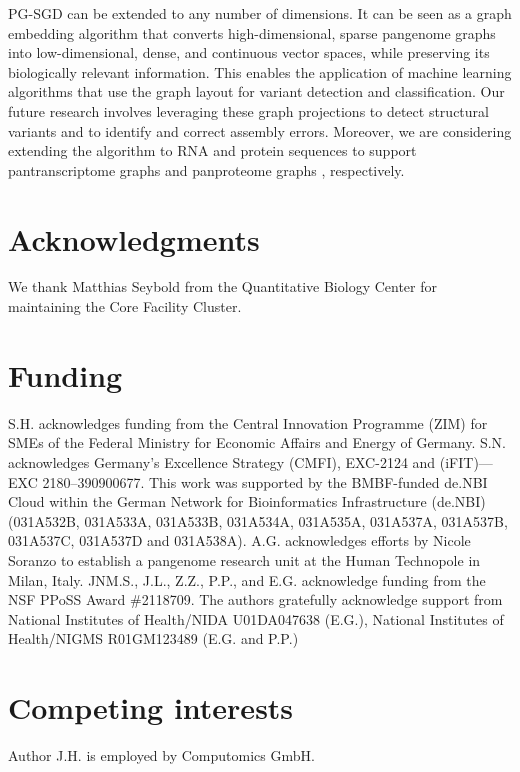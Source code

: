 \documentclass{bioinfo}
\theoremstyle{definition}
\begin{document}
	PG-SGD can be extended to any number of dimensions.
	It can be seen as a graph embedding algorithm that converts high-dimensional, sparse pangenome graphs into low-dimensional, dense, and continuous vector spaces, while preserving its biologically relevant information.
	This enables the application of machine learning algorithms that use the graph layout for variant detection and classification. 
	Our future research involves leveraging these graph projections to detect structural variants and to identify and correct assembly errors. 
	Moreover, we are considering extending the algorithm to RNA and protein sequences to support pantranscriptome graphs \citep{sibbesen_haplotype-aware_2023} and panproteome graphs \citep{dabbaghie_panpa:_2023}, respectively.

	\section*{Acknowledgments}

	We thank Matthias Seybold from the Quantitative Biology Center for maintaining the Core Facility Cluster.
	
	\section*{Funding}
	
	S.H. acknowledges funding from the Central Innovation Programme (ZIM) for SMEs of the Federal Ministry for Economic Affairs and Energy of Germany.
	S.N. acknowledges Germany’s Excellence Strategy (CMFI), EXC-2124 and (iFIT)—EXC 2180–390900677.
	This work was supported by the BMBF-funded de.NBI Cloud within the German Network for Bioinformatics Infrastructure (de.NBI) (031A532B, 031A533A, 031A533B, 031A534A, 031A535A, 031A537A, 031A537B, 031A537C, 031A537D and 031A538A).
	A.G. acknowledges efforts by Nicole Soranzo to establish a pangenome research unit at the Human Technopole in Milan, Italy.
	JNM.S., J.L., Z.Z., P.P., and E.G. acknowledge funding from the NSF PPoSS Award \#2118709. The authors gratefully acknowledge support from National Institutes of Health/NIDA U01DA047638 (E.G.), National Institutes of Health/NIGMS R01GM123489 (E.G. and P.P.)
	
	\section*{Competing interests}
	Author J.H. is employed by Computomics GmbH.
	
\end{document}
